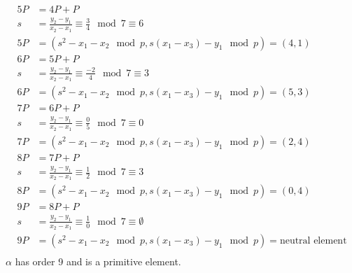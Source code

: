 \documentclass{math}
\begin{document}
\begin{enumerate}
\begin{align*}
    5P &= 4P+P \\
    s &= \frac{y_2-y_1}{x_2-x_1} \equiv \frac{3}{4}\mod7 \equiv 6 \\
    5P &= (s^2-x_1-x_2\mod p, s(x_1-x_3)-y_1\mod p) = (4,1) \\
    6P &= 5P+P \\
    s &= \frac{y_2-y_1}{x_2-x_1} \equiv \frac{-2}{4}\mod7 \equiv 3 \\
    6P &= (s^2-x_1-x_2\mod p, s(x_1-x_3)-y_1\mod p) = (5,3) \\
    7P &= 6P+P \\
    s &= \frac{y_2-y_1}{x_2-x_1} \equiv \frac{0}{5}\mod7 \equiv 0 \\
    7P &= (s^2-x_1-x_2\mod p, s(x_1-x_3)-y_1\mod p) = (2,4) \\
    8P &= 7P+P \\
    s &= \frac{y_2-y_1}{x_2-x_1} \equiv \frac{1}{2}\mod7 \equiv 3 \\
    8P &= (s^2-x_1-x_2\mod p, s(x_1-x_3)-y_1\mod p) = (0,4) \\
    9P &= 8P+P \\
    s &= \frac{y_2-y_1}{x_2-x_1} \equiv \frac{1}{0}\mod7 \equiv \emptyset \\
    9P &= (s^2-x_1-x_2\mod p, s(x_1-x_3)-y_1\mod p) = \text{neutral element} \\
  \end{align*}
  \( \alpha \) has order 9 and is a primitive element.
\end{enumerate}
\end{document}
